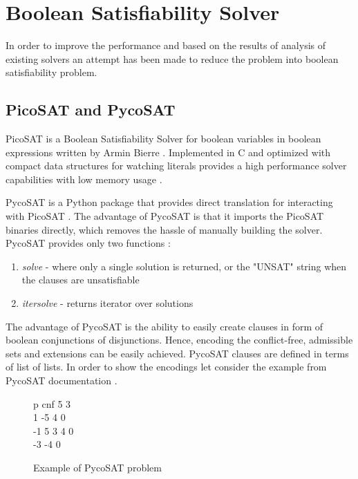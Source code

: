 \section{Boolean Satisfiability Solver} \label{section:satSolver}
In order to improve the performance and based on the results of analysis of existing solvers an attempt has been made to reduce the problem into boolean satisfiability problem. 

\subsection{PicoSAT and PycoSAT} \label{section:pycosat}
PicoSAT is a Boolean Satisfiability Solver for boolean variables in boolean expressions written by Armin Bierre \citep{picosatMan}. Implemented in C and optimized with compact data structures for watching literals provides a high performance solver capabilities with low memory usage \citep{picosat}.

PycoSAT is a Python package that provides direct translation for interacting with PicoSAT \citep{pycoSat}. The advantage of PycoSAT is that it imports the PicoSAT binaries directly, which removes the hassle of manually building the solver. PycoSAT provides only two functions \citep{pycosatPyPi}: 
\begin{enumerate}
	\item \textit{solve} - where only a single solution is returned, or the "UNSAT" string when the clauses are unsatisfiable
	\item \textit{itersolve} - returns iterator over solutions
\end{enumerate}

The advantage of PycoSAT is the ability to easily create clauses in form of boolean conjunctions of disjunctions. Hence, encoding the conflict-free, admissible sets and extensions can be easily achieved. PycoSAT clauses are defined in terms of list of lists. In order to show the encodings let consider the example from PycoSAT documentation \citep{pycosatGithub}. 

\begin{figure}
\begin{tcolorbox}
	p cnf 5 3 \\
	1 -5 4 0 \\ 
	-1 5 3 4 0 \\
	-3 -4 0 
\end{tcolorbox}
\caption{Example of PycoSAT problem}
\label{fig:pycosat1}
\end{figure}

